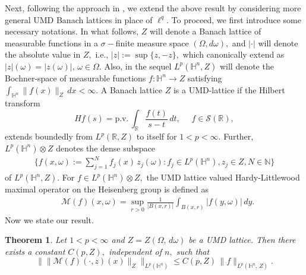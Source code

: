 \documentclass[11pt]{amsart}
\newcommand{\Ha}{\mathbb{H}^n}
\newtheorem{theorem}{Theorem}[section]
\theoremstyle{definition}
\numberwithin{equation}{section}
\begin{document}
Next, following the approach in \cite{DK}, we extend the above result by considering more general UMD Banach lattices in place of $\ell^q$. To proceed, we first introduce some necessary notations. In what follows, $Z$ will denote a Banach lattice of measurable functions in a $\sigma-$finite measure space $(\Omega, d \omega),$ and $|\cdot|$ will denote the absolute value in $Z,$ i.e., $|z|:=\sup\{z, -z\},$ which canonically extend as $|z|(\omega)=|z(\omega)|, \,\omega\in \Omega.$  Also, in the sequel $L^p(\Ha, Z)$ will denote the Bochner-space of measurable functions $f:\Ha\to Z$ satisfying $\int_{\Ha}\|f(x)\|_{Z}\, dx<\infty.$ A Banach lattice $Z$ is a UMD-lattice if the Hilbert transform 
$$Hf(s)=\text{p.v.}\,\int_{\mathbb{R}}\frac{f(t)}{s-t}\, dt,\quad\,\, f\in \mathcal{S}(\mathbb{R}),$$
extends boundedly from $L^p(\mathbb{R}, Z)$ to itself for $1<p<\infty.$ Further, $L^p(\Ha)\otimes Z$ denotes the dense subspace
\begin{align}
\big\{f(x, \omega):=\sum_{j=1}^{N}f_{j}(x)\, z_{j}(\omega): f_{j}\in L^p(\Ha), z_{j}\in Z, N\in \mathbb{N}\big\}
\end{align}
of $L^p(\Ha, Z).$ For $f\in L^p(\Ha)\otimes Z,$ the UMD lattice valued Hardy-Littlewood maximal operator on the Heisenberg group is defined as
\begin{align}
&\mathcal{M}(f)(x, \omega)=\sup_{r>0}\frac{1}{|B(x, r)|}\int_{B(x, r)} |f(y, \omega)|\, dy.
\end{align}
Now we state our result.
\begin{theorem}
\label{main-thm2}
Let $1<p<\infty$ and $Z=Z(\Omega,\, d\omega)$ be a UMD lattice. Then there exists a constant $C(p, Z),$ independent of $n,$ such that
$$\bigg\| \big\|\mathcal{M}(f)(\cdot, z)(x)\big\|_{Z}\bigg\|_{L^p(\Ha)}\leq C(p, Z)\, \|f\|_{L^p(\Ha,\, Z)}.$$
\end{theorem}
\end{document}
